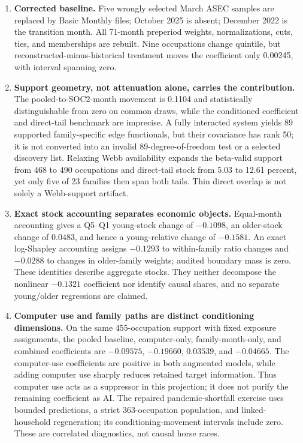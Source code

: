 \documentclass[11pt,letterpaper]{article}
\begin{document}
\begin{enumerate}[leftmargin=1.8em]
\item \textbf{Corrected baseline.}  Five wrongly selected March ASEC samples are replaced by Basic Monthly files; October 2025 is absent; December 2022 is the transition month.  All 71-month preperiod weights, normalizations, cuts, ties, and memberships are rebuilt.  Nine occupations change quintile, but reconstructed-minus-historical treatment moves the coefficient only 0.00245, with interval spanning zero.
\item \textbf{Support geometry, not attenuation alone, carries the contribution.}  The pooled-to-SOC2-month movement is 0.1104 and statistically distinguishable from zero on common draws, while the conditioned coefficient and direct-tail benchmark are imprecise.  A fully interacted system yields 89 supported family-specific edge functionals, but their covariance has rank 50; it is not converted into an invalid 89-degree-of-freedom test or a selected discovery list.  Relaxing Webb availability expands the beta-valid support from 468 to 490 occupations and direct-tail stock from 5.03 to 12.61 percent, yet only five of 23 families then span both tails.  Thin direct overlap is not solely a Webb-support artifact.
\item \textbf{Exact stock accounting separates economic objects.}  Equal-month accounting gives a Q5--Q1 young-stock change of $-0.1098$, an older-stock change of $0.0483$, and hence a young-relative change of $-0.1581$.  An exact log-Shapley accounting assigns $-0.1293$ to within-family ratio changes and $-0.0288$ to changes in older-family weights; audited boundary mass is zero.  These identities describe aggregate stocks.  They neither decompose the nonlinear $-0.1321$ coefficient nor identify causal shares, and no separate young/older regressions are claimed.
\item \textbf{Computer use and family paths are distinct conditioning dimensions.}  On the same 455-occupation support with fixed exposure assignments, the pooled baseline, computer-only, family-month-only, and combined coefficients are $-0.09575$, $-0.19660$, $0.03539$, and $-0.04665$.  The computer-use coefficients are positive in both augmented models, while adding computer use sharply reduces retained target information.  Thus computer use acts as a suppressor in this projection; it does not purify the remaining coefficient as AI.  The repaired pandemic-shortfall exercise uses bounded predictions, a strict 363-occupation population, and linked-household regeneration; its conditioning-movement intervals include zero.  These are correlated diagnostics, not causal horse races.

\end{enumerate}
\end{document}
